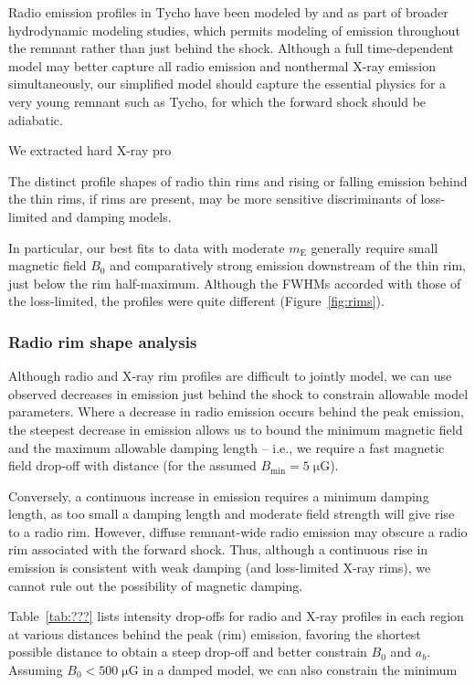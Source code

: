 \documentclass[iop, apj, numberedappendix]{emulateapj}
\newcommand*{\mt}{\mathrm}
\newcommand*{\unit}[1]{\;\mt{#1}}  %
\newcommand*{\mE}{m_\mt{E}}
\newcommand*{\muG}{\unit{\mu G}}
\begin{document}
Radio emission profiles in Tycho have been modeled by \citet{cassam-chenai2007}
and \citet{morlino2012} as part of broader hydrodynamic modeling studies,
which permits modeling of emission throughout the remnant rather than just
behind the shock.  Although a full time-dependent model may better capture all
radio emission and nonthermal X-ray emission simultaneously, our simplified
model should capture the essential physics for a very young remnant such as
Tycho, for which the forward shock should be adiabatic.


We extracted hard X-ray pro

The distinct profile shapes of radio thin rims and rising or falling emission
behind the thin rims, if rims are present, may be more sensitive discriminants
of loss-limited and damping models.

In particular, our best fits to data with moderate $\mE$ generally require
small magnetic field $B_0$ and comparatively strong emission downstream of the
thin rim, just below the rim half-maximum.  Although the FWHMs accorded with
those of the loss-limited, the profiles were quite different
(Figure~\ref{fig:rims}).

\subsubsection{Radio rim shape analysis}

Although radio and X-ray rim profiles are difficult to jointly model, we can
use observed decreases in emission just behind the shock to constrain allowable
model parameters.  Where a decrease in radio emission occurs behind the peak
emission, the steepest decrease in emission allows us to bound the minimum
magnetic field and the maximum allowable damping length -- i.e., we require a
fast magnetic field drop-off with distance (for the assumed $B_{\mt{min}} = 5
\muG$).

Conversely, a continuous increase in emission requires a minimum damping
length, as too small a damping length and moderate field strength will give
rise to a radio rim.  However, diffuse remnant-wide radio emission may obscure
a radio rim associated with the forward shock.  Thus, although a continuous
rise in emission is consistent with weak damping (and loss-limited X-ray rims),
we cannot rule out the possibility of magnetic damping.

Table~\ref{tab:???} lists intensity drop-offs for radio and X-ray profiles in
each region at various distances behind the peak (rim) emission, favoring the
shortest possible distance to obtain a steep drop-off and better constrain
$B_0$ and $a_b$.  Assuming $B_0 < 500 \muG$ in a damped model, we can also
constrain the minimum
\end{document}
